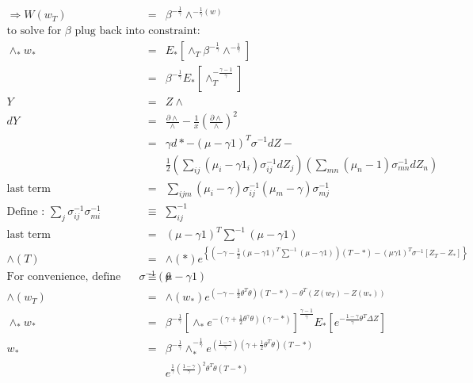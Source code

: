 \documentclass[]{article}
\begin{document}
\begin{eqnarray*}
\Rightarrow W(w_T) &=& \beta ^{-\frac{1}{\gamma}} \wedge ^{-\frac{1}{\gamma}(w)}\\
\mbox{to solve for $\beta $ plug back into constraint:}\\
\wedge _* w_* &=& E_* \left[ \wedge _T \beta ^{-\frac{1}{\gamma}} \wedge ^{-\frac{1}{\gamma}}\right]\\
&=& \beta ^{-\frac{1}{\gamma}} E_*\left[ \wedge _T^{-\frac{\gamma -1}{\gamma}} \right]\\
Y &=& Z \wedge \\
dY &=& \frac{\partial \wedge }{\wedge} - \frac{1}{x} \left( \frac{\partial \wedge}{\wedge} \right)^2\\
&=& \gamma d* - \left( \mu -\gamma 1 \right)^T \sigma ^{-1} dZ - \\
&& \frac{1}{2} \left( \sum_{ij} \left( \mu _i - \gamma 1_i \right) \sigma _{ij}^{-1} dZ_j \right) \left( \sum_{mn} \left( \mu _n - 1 \right) \sigma _{mn}^{-1} dZ_n \right)\\
\mbox{last term } &=& \sum_{ijm} \left( \mu _i -\gamma \right) \sigma _{ij}^{-1} \left( \mu _m -\gamma \right) \sigma _{mj} ^{-1}\\
\mbox{Define : } \sum_{j} \sigma _{ij}^{-1} \sigma _{mi}^{-1} &\equiv & \sum_{ij}^{-1}\\
\mbox{last term } &=& \left( \mu - \gamma 1 \right)^T \sum^{-1} \left( \mu - \gamma 1 \right)\\
\wedge (T) &=& \wedge (*) e^{ \left\{ \left( -\gamma -\frac{1}{2}\left( \mu -\gamma 1 \right)^T \sum^{-1} \left( \mu -\gamma 1 \right) \right)\left( T-* \right) - \left( \mu \gamma 1 \right)^T \sigma ^{-1} \left[ Z_T - Z_*\right] \right\} }\\
\mbox{For convenience, define vector } \sigma ^{-1} (\mu - \gamma 1) &\equiv & \theta \\
\wedge (w_T) &=& \wedge (w_*) e^{(-\gamma -\frac{1}{2} \theta ^T \theta)(T - *) - \theta ^T(Z(w_T)-Z(w_*))}\\
\wedge _* w_* &=& \beta ^{-\frac{1}{\gamma}} \left[ \wedge _* e^{-\left(\gamma + \frac{1}{2} \theta ^\gamma \theta \right)\left( \gamma -* \right)} \right] ^{\frac{\gamma -1}{\gamma}} E_*\left[e^{-\frac{1-\gamma}{\gamma}\theta ^T \Delta Z}\right]\\
w_* &=& \beta^{-\frac{1}{\gamma}} \wedge _*^{-\frac{1}{\gamma}} e^{\left( \frac{1-\gamma}{\gamma}\right) \left(\gamma +\frac{1}{2} \theta ^T \theta \right)\left( T-*\right)} \\
&&e^{\frac{1}{\gamma} \left(\frac{1-\gamma}{\gamma}\right)^2 \theta ^T \theta \left( T-*\right)}\\

\end{eqnarray*}
\end{document}
